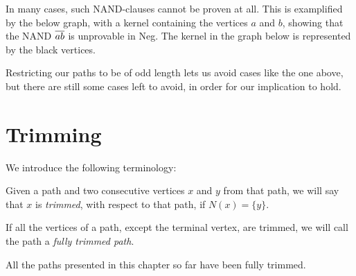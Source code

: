 In many cases, such NAND-clauses cannot be proven at all.
This is examplified by the below graph, with a kernel containing the vertices $a$ and $b$, showing that the NAND $\ol{ab}$ is unprovable in Neg.
The kernel in the graph below is represented by the black vertices.\par
\begin{figure}[!h]
  \centering
  \caption{}
  \label{fig:kernel_even}
\end{figure}
Restricting our paths to be of odd length lets us avoid cases like the one above, but there are still some cases left to avoid, in order for our implication to hold.
\section{Trimming}
\label{sec:Trimming}
We introduce the following terminology:
\begin{definition}
  Given a path and two consecutive vertices $x$ and $y$ from that path, we will say that $x$ is \textit{trimmed}, with respect to that path, if $N(x) = \{y\}$.
\end{definition}
\begin{definition}
  If all the vertices of a path, except the terminal vertex, are trimmed, we will call the path a \textit{fully trimmed path}.
\end{definition}
All the paths presented in this chapter so far have been fully trimmed.

